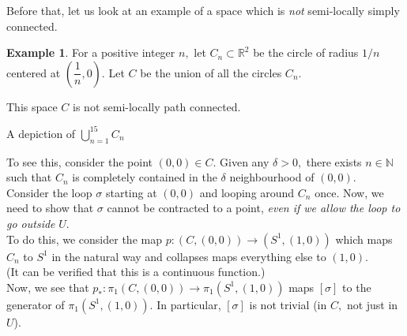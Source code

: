 \documentclass[12pt]{article}
\theoremstyle{definition}
\numberwithin{thm}{section}
\newtheorem{ex}{Example}
\begin{document}
%
Before that, let us look at an example of a space which is \emph{not} semi-locally simply connected.
\begin{ex}
	For a positive integer $n,$ let $C_n \subset \mathbb{R}^2$ be the circle of radius $1/n$ centered at $\left(\dfrac{1}{n}, 0\right).$ Let $C$ be the union of all the circles $C_n.$

	This space $C$ is not semi-locally path connected.

	\begin{center}

		A depiction of $\displaystyle\bigcup_{n = 1}^{15}C_n$
	\end{center}

	To see this, consider the point $(0, 0) \in C.$ Given any $\delta > 0,$ there exists $n \in \mathbb{N}$ such that $C_n$ is completely contained in the $\delta$ neighbourhood of $(0, 0).$\\
	Consider the loop $\sigma$ starting at $(0, 0)$ and looping around $C_n$ once. Now, we need to show that $\sigma$ cannot be contracted to a point, \emph{even if we allow the loop to go outside} $U.$\\
	To do this, we consider the map $p:(C, (0, 0)) \to (S^1, (1, 0))$ which maps $C_n$ to $S^1$ in the natural way and collapses maps everything else to $(1, 0).$\\
	(It can be verified that this is a continuous function.)\\
	Now, we see that $p_*:\pi_1(C, (0, 0)) \to \pi_1(S^1, (1, 0))$ maps $[\sigma]$ to the generator of $\pi_1(S^1, (1, 0)).$ In particular, $[\sigma]$ is not trivial (in $C,$ not just in $U$).
\end{ex}
\end{document}
